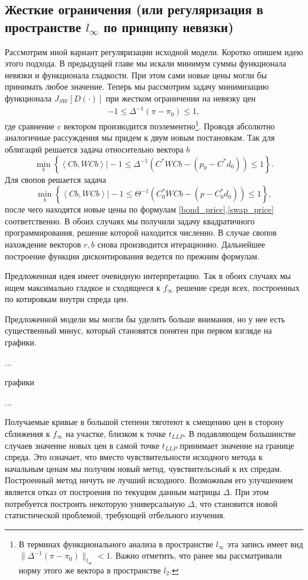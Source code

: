 \documentclass[10pt]{article}
\theoremstyle{definition}
\theoremstyle{remark}
\theoremstyle{plain}
\newcommand{\w}{f_\infty}
\newcommand{\scalar}[2]{\left<#1,#2\right>}
\begin{document}
\subsection{Жесткие ограничения (или регуляризация в пространстве $l_\infty$ по принципу невязки)}
Рассмотрим иной вариант регуляризации исходной модели. Коротко опишем идею этого подхода. В предыдущей главе мы искали минимум суммы функционала невязки и функционала гладкости. При этом сами новые цены могли бы принимать любое значение. Теперь мы рассмотрим задачу минимизацию функционала $J_{SW}[D(\cdot)]$ при жестком ограничении на невязку цен
\begin{align*}
-1\leqslant \Delta^{-1}(\pi-\pi_0) \leqslant 1,
\end{align*}
где сравнение c вектором производится поэлементно\footnote{В терминах функционального анализа в пространстве $l_\infty$ эта запись имеет вид $\|\Delta^{-1}(\pi-\pi_0)\|_{l_\infty}<1$. Важно отметить, что ранее мы рассматривали норму этого же вектора в пространстве $l_2$.}. 
Проводя абсолютно аналогичные рассуждения мы придем к двум новым постановкам. Так для облигаций решается задача относительно вектора $b$
$$
\min\limits_{b}
\left\{
	\left.
		\scalar{Cb}{WCb}
	\right| 
	-1 \leqslant 
	\Delta^{-1}\left(C^*WCb - (p_0-C^*d_0) \right)
	\leqslant 1 
\right\}.
$$
Для свопов решается задача
$$
\min\limits_{b}
\left\{
	\left.
		\scalar{Cb}{WCb}
	\right| 
	-1 \leqslant 
	\Theta^{-1}\left( C_0^*WCb - (p-C_0^*d_0)\right)
	\leqslant 1 
\right\},
$$
после чего находятся новые цены по формулам \eqref{bond_price},\eqref{swap_price} соответственно.
В обоих случаях мы получили задачу квадратичного программирования, решение которой находится численно.
В случае свопов нахождение векторов $r,b$ снова производится итерационно. Дальнейшее построение функции дисконтирования ведется по прежним формулам. 

Предложенная идея имеет очевидную интерпретацию. Так в обоих случаях мы ищем максимально гладкое и сходящееся к $\w$ решение среди всех, построенных по котировкам внутри спреда цен. 

Предложенной модели мы могли бы уделить больше внимания, но у нее есть существенный минус, который становятся понятен при первом взгляде на графики.

...

графики

...

Получаемые кривые в большой степени тяготеют к смещению цен в сторону сближения к $\w$ на участке, близком к точке $t_{LLP}$. В подавляющем большинстве случаев значение новых цен в самой точке $t_{LLP}$ принимает значение на границе спреда. Это означает, что вместо чувствительности исходного метода к начальным ценам мы получим новый метод, чувствительсный к их спредам. Построенный метод ничуть не лучший исходного. Возможным его улучшением является отказ от построения по текущим данным матрицы $\Delta$. При этом потребуется построить некоторую универсальную $\Delta$, что становится новой статистической проблемой, требующей отбельного изучения.  
\end{document}

